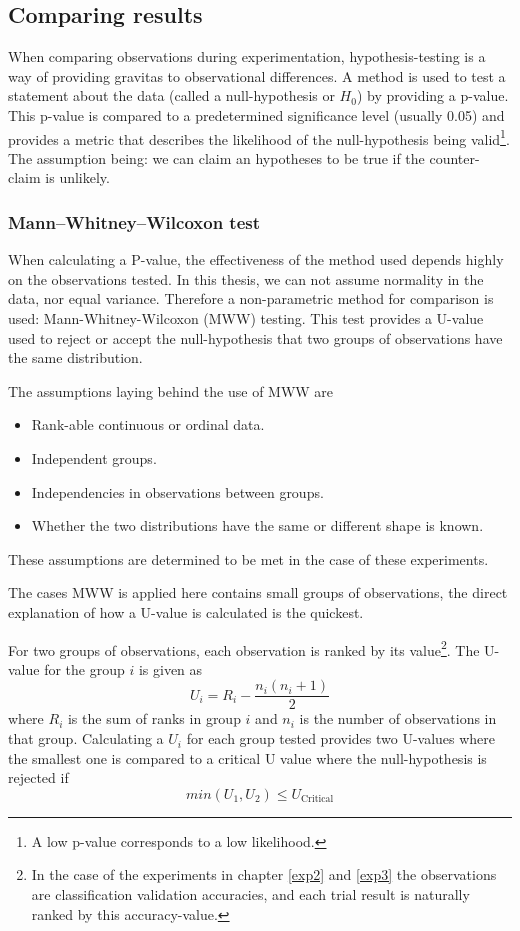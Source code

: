 \subsection{Comparing results}
When comparing observations during experimentation, hypothesis-testing is a way of providing gravitas to observational differences. A method is used to test a statement about the data (called a null-hypothesis or \(H_{0}\)) by providing a p-value. This p-value is compared to a predetermined significance level (usually 0.05) and provides a metric that describes the likelihood of the null-hypothesis being valid\footnote{A low p-value corresponds to a low likelihood.}. The assumption being: we can claim an hypotheses to be true if the counter-claim is unlikely.  

\subsubsection{Mann–Whitney–Wilcoxon test}
\label{background:mannwhitney}
When calculating a P-value, the effectiveness of the method used depends highly on the observations tested. In this thesis, we can not assume normality in the data, nor equal variance. Therefore a non-parametric method for comparison is used: Mann-Whitney-Wilcoxon (MWW) testing. This test provides a U-value used to reject or accept the null-hypothesis that two groups of observations have the same distribution. 

The assumptions laying behind the use of MWW are 
\begin{itemize}
    \item Rank-able continuous or ordinal data.
    \item Independent groups.
    \item Independencies in observations between groups.
    \item Whether the two distributions have the same or different shape is known. 
\end{itemize}
These assumptions are determined to be met in the case of these experiments. 

The cases MWW is applied here contains small groups of observations, the direct explanation of how a U-value is calculated is the quickest. 

For two groups of observations, each observation is ranked by its value\footnote{In the case of the experiments in chapter \ref{exp2} and \ref{exp3} the observations are classification validation accuracies, and each trial result is naturally ranked by this accuracy-value.}. The U-value for the group \(i\) is given as 
\begin{equation*}
    U_{i} = R_{i}-\frac{n_{i}(n_{i}+1)}{2}
\end{equation*}
where \(R_{i}\) is the sum of ranks in group \(i\) and \(n_{i}\) is the number of observations in that group. 
Calculating a \(U_{i}\) for each group tested provides two U-values where the smallest one is compared to a critical U value where the null-hypothesis is rejected if 
\begin{equation*}
    min(U_{1}, U_{2}) \leq U_{\text{Critical}}
\end{equation*}

